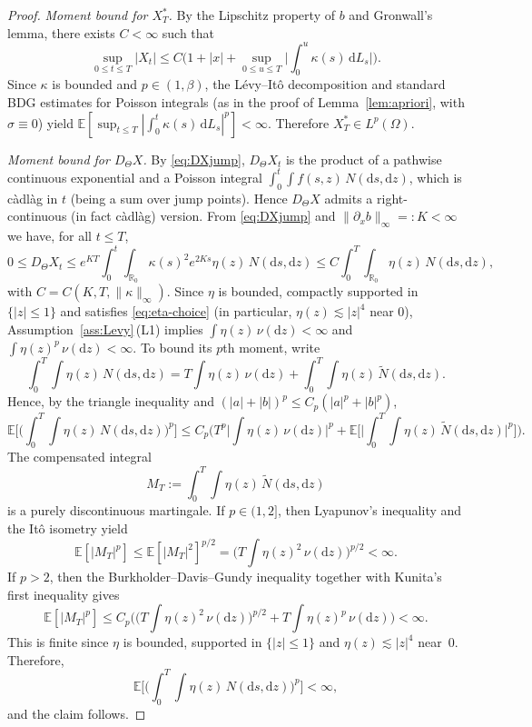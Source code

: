 \documentclass[11pt]{article}
\newcommand{\R}{\mathbb{R}}
\newcommand{\E}{\mathbb{E}}
\newcommand{\1}{\mathbf{1}}
\newcommand{\dd}{\mathrm{d}}
\newcommand{\Xstar}{X^{\ast}}
\theoremstyle{plain}
\theoremstyle{definition}
\theoremstyle{remark}
\begin{document}
\begin{proof}
\emph{Moment bound for $\Xstar_T$.}
By the Lipschitz property of $b$ and Gronwall's lemma, there exists $C<\infty$ such that
\[
\sup_{0\le t\le T}|X_t|\le C\Big(1+|x|+\sup_{0\le u\le T}\Big|\int_0^u \kappa(s)\,\dd L_s\Big|\Big).
\]
Since $\kappa$ is bounded and $p\in(1,\beta)$, the L\'evy--It\^o decomposition and standard BDG estimates for Poisson integrals
(as in the proof of Lemma~\ref{lem:apriori}, with $\sigma\equiv0$) yield
$\E[\sup_{t\le T}|\int_0^t \kappa(s)\,\dd L_s|^p]<\infty$.
Therefore $\Xstar_T\in L^p(\Omega)$.

\medskip
\emph{Moment bound for $D_\Theta X$.}
By \eqref{eq:DXjump}, $D_\Theta X_t$ is the product of a pathwise continuous exponential and a Poisson integral
$\int_0^t\int f(s,z)\,N(\dd s,\dd z)$, which is c\`adl\`ag in $t$ (being a sum over jump points).
Hence $D_\Theta X$ admits a right-continuous (in fact c\`adl\`ag) version.
From \eqref{eq:DXjump} and $\|\partial_x b\|_\infty=:K<\infty$ we have, for all $t\le T$,
\[
0\le D_\Theta X_t
\le e^{KT}\int_0^t\int_{\R_0} \kappa(s)^2 e^{2Ks}\eta(z)\,N(\dd s,\dd z)
\le C\int_0^T\int_{\R_0}\eta(z)\,N(\dd s,\dd z),
\]
with $C=C(K,T,\|\kappa\|_\infty)$.
Since $\eta$ is bounded, compactly supported in $\{|z|\le 1\}$ and satisfies \eqref{eq:eta-choice} (in particular, $\eta(z)\lesssim |z|^4$ near $0$),
Assumption~\ref{ass:Levy}\,(L1) implies $\int \eta(z)\,\nu(\dd z)<\infty$ and $\int \eta(z)^p\,\nu(\dd z)<\infty$.
To bound its $p$th moment, write
\[
\int_0^T\int \eta(z)\,N(\dd s,\dd z)
= T\int \eta(z)\,\nu(\dd z)+\int_0^T\int \eta(z)\,\tilde N(\dd s,\dd z).
\]
Hence, by the triangle inequality and $(|a|+|b|)^p\le C_p(|a|^p+|b|^p)$,
\[
\E\Big[\Big(\int_0^T\int \eta(z)\,N(\dd s,\dd z)\Big)^p\Big]
\le C_p\Big(T^p\Big|\int \eta(z)\,\nu(\dd z)\Big|^p+\E\Big[\Big|\int_0^T\int \eta(z)\,\tilde N(\dd s,\dd z)\Big|^p\Big]\Big).
\]
The compensated integral
\[
M_T:=\int_0^T\int \eta(z)\,\tilde N(\dd s,\dd z)
\]
is a purely discontinuous martingale.
If $p\in(1,2]$, then Lyapunov's inequality and the It\^o isometry yield
\[
\E[|M_T|^p]\le \E[|M_T|^2]^{p/2}
=\Big(T\int \eta(z)^2\,\nu(\dd z)\Big)^{p/2}<\infty.
\]
If $p>2$, then the Burkholder--Davis--Gundy inequality together with Kunita's first inequality gives
\[
\E[|M_T|^p]\le C_p\Big( \Big(T\int \eta(z)^2\,\nu(\dd z)\Big)^{p/2}
+T\int \eta(z)^p\,\nu(\dd z)\Big)<\infty.
\]
This is finite since $\eta$ is bounded, supported in $\{|z|\le 1\}$ and $\eta(z)\lesssim |z|^4$ near~$0$.
Therefore,
\[
\E\Big[\Big(\int_0^T\int \eta(z)\,N(\dd s,\dd z)\Big)^p\Big]<\infty,
\]
and the claim follows.
\end{proof}
\end{document}
